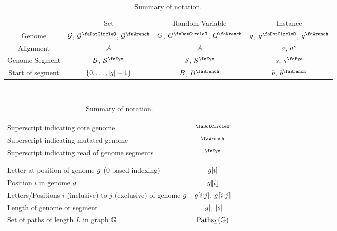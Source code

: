\begin{table}
	\centering
	\small
	\begin{tabular}{ c c c c }
		& Set & Random Variable & Instance \\
		Genome & $\mathcal{G}$, $\genomes^\gcore$, $\genomes^\gmut$ & $G$, $\genomeRV^\gcore$, $\genomeRV^\gmut$ & $g$, $\genome^\gcore$, $\genome^\gmut$ \\
		Alignment & $\mathcal{A}$ & $A$ & $a$, $a^\star$ \\
		Genome Segment & $\mathcal{S}$, $\segments^\gread$ & $S$, $\segmentRV^\gread$ & $s$, $\segment^\gread$ \\
		Start of segment & $\{0,\dots,\left| g \right|-1 \}$ & $B$, $\startInGenomeRV^\gmut$ & $b$, $\startInGenome^\gmut$
	\end{tabular} \\
	\begin{tabular}{ l c }
		\\[-1em] \hline \\[-1em]
		Superscript indicating core genome & $^\gcore$ \\ %
		Superscript indicating mutated genome & $^\gmut$ \\ %
		Superscript indicating read of genome segments & $^\gread$ \\ %
		\\[-1em] \hline \\[-1em]
		Letter at \nth{i} position of genome $g$ ($0$-based indexing) & $g[i]$ \\
		Position $i$ in genome $g$ & $g \llbracket i \rrbracket$ \\
		Letters/Positions $i$ (inclusive) to $j$ (exclusive) of genome $g$ & $g[i {:} j]$, $g \llbracket i {:} j \rrbracket$ \\
		Length of genome or segment & $\left| g \right|$, $\left| s \right|$ \\
		Set of paths of length $L$ in graph $\mathbb{G}$ & $\text{Paths}_{L}(\mathbb{G})$
	\end{tabular}
	\caption{Summary of notation.}
	\label{tab:notation}
\end{table}

